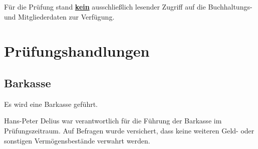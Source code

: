 \documentclass[%
	titlepage,oneside,12pt,headlines=1.5,numbers=noenddot, chapterprefix=false,parskip=full-,DIV=14,pagesize,headings=small]{scrreprt}
\begin{document}
Für die Prüfung stand \underline{\textbf{kein}} ausschließlich lesender Zugriff auf die Buchhaltungs- und Mitgliederdaten zur Verfügung.


\chapter{Prüfungshandlungen}
\section{Barkasse}
Es wird eine Barkasse geführt.

Hans-Peter Delius war verantwortlich für die Führung der Barkasse im Prüfungszeitraum. Auf Befragen wurde versichert, dass keine weiteren Geld- oder sonstigen Vermögensbestände verwahrt werden.
\end{document}
